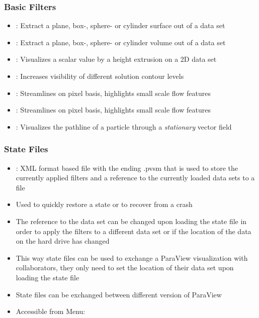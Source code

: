 \begin{frame}
  \frametitle{Basic Filters}

    \begin{itemize}
      \item {}: Extract a plane, box-, sphere- or cylinder surface out of a data set
      \item {}: Extract a plane, box-, sphere- or cylinder volume out of a data set
      \item {}: Visualizes a scalar value by a height extrusion on a 2D data set 
      \item {}: Increases visibility of different solution contour levels 
      \item {}: Streamlines on pixel basis, highlights small scale flow features 
      \item {}: Streamlines on pixel basis, highlights small scale flow features 

      \item {}: Visualizes the pathline of a particle through a \emph{stationary} vector field 
    \end{itemize}

\end{frame}

\begin{frame}
  \frametitle{State Files}

    \begin{itemize}
      \item {}: XML format based file with the ending .pvsm that is used to store the currently applied filters and a reference to the currently loaded data sets to a file
      \item Used to quickly restore a state or to recover from a crash
      \item The reference to the data set can be changed upon loading the state file in order to apply the
        filters to a different data set or if the location of the data on the hard drive has changed
      \item This way state files can be used to exchange a ParaView visualization with collaborators, they only need to set the location of their data set upon loading the state file
      \item State files can be exchanged between different version of ParaView
      \item Accessible from Menu: 
    \end{itemize}
        

\end{frame}

